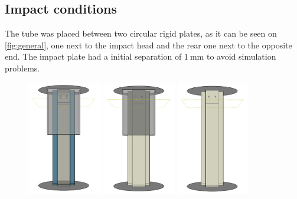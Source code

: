 \documentclass[
documentsize = a4, %
font = cmr, %
typesize = 11, %
printmode = true,
onehalfspacing = true,
language = en, %
titlepage = udciccp, %
degree = pt, %
dedication = true,
acknowledgements = true,
abstract-en = true,
abstract-es = false,
abstract-ga = false,
epigraphs = true,
toc = true,
lof = true,
lot = true,
frontmatterintoc = false,
notation = false,
minimal = false,
]{UDCthesis}
\begin{document}
\subsection{Impact conditions}  %
\label{sec:impact}

The tube was placed between two circular rigid plates, as it can be seen on \cref{fig:general}, one next to the impact head and the rear one next to the opposite end. The impact plate had a initial separation of $\SI{1}{\mm}$ to avoid simulation problems.

\begin{figure}
	\centering
	\begin{minipage}[b]{.22\linewidth}
		\centering
		\includegraphics[height=5cm]{IMG_CUTRES/general_transp}
	\end{minipage}
	\quad
	\begin{minipage}[b]{.22\linewidth}
		\centering
		\includegraphics[height=5cm]{IMG_CUTRES/general_rigtransp}
	\end{minipage}
	\quad
	\begin{minipage}[b]{.22\linewidth}
		\centering
		\includegraphics[height=5cm]{IMG_CUTRES/general_noSb}

\end{minipage}
\end{figure}
\end{document}
